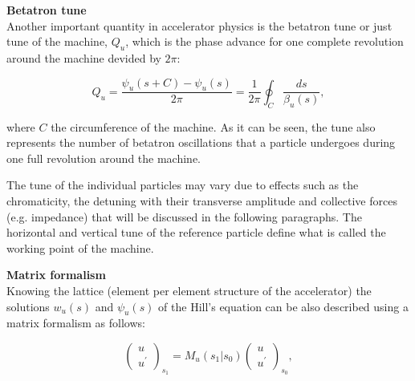 

\textbf{Betatron tune}\\
Another important quantity in accelerator physics is the betatron tune or just tune of the machine, $Q_u$, which is the phase advance for one complete revolution around the machine devided by $2\pi$:

\begin{equation}\label{eq:betatron_tune}
    Q_u = \frac{\psi_u(s+C)-\psi_u(s)}{2\pi} = \frac{1}{2\pi} \oint_C \frac{ds}{\beta_u(s)},
\end{equation}

where $C$ the circumference of the machine. As it can be seen, the tune also represents the number of betatron oscillations that a particle undergoes during one full revolution around the machine. 

The tune of the individual particles may vary due to effects such as the chromaticity, the detuning with their transverse amplitude and collective forces (e.g. impedance) that will be discussed in the following paragraphs. The horizontal and vertical tune of the reference particle define what is called the working point of the machine. 


\textbf{Matrix formalism}\\
Knowing the lattice (element per element structure of the accelerator) the solutions $w_u(s)$ and $\psi_u(s)$ of the Hill's equation can be also described using a matrix formalism as follows:

\begin{equation}\label{eq:matrix_formalism_intro}
   \begin{pmatrix}
    u\\ 
    u^\prime
    \end{pmatrix}_{s_1} = M_u (s_1 |  s_0) \begin{pmatrix}
    u\\ 
    u^\prime
    \end{pmatrix}_{s_0},
\end{equation}

